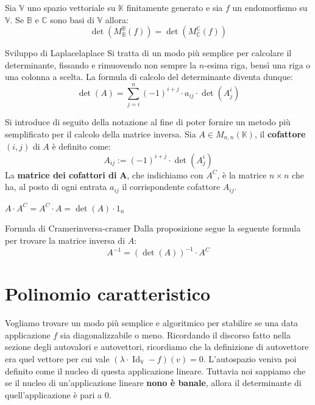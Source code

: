 \documentclass[12pt]{report}
\newcommand{\C}{\mathbb{C}}
\newcommand{\K}{\mathbb{K}}
\newcommand{\V}{\mathbb{V}}
\newcommand{\associatedmatrix}[2]{M^{\mathbb{#1}}_{\mathbb{#2}}}
\begin{document}
	\begin{corollario}{}{}
		Sia $\V$ uno spazio vettoriale su $\K$ finitamente generato e sia $f$ un endomorfismo su $\V$. Se $\mathbb{B}$ e $\C$ sono basi di $\V$ allora:
		\[
			\det(\associatedmatrix{B}{B}(f)) = \det(\associatedmatrix{C}{C}(f))
		\] 
	\end{corollario}
	
	\begin{teorema}{Sviluppo di Laplace}{laplace}
		Si tratta di un modo più semplice per calcolare il determinante, fissando e rimuovendo non sempre la $n$-esima riga, bensì una riga o una colonna a scelta. La formula di calcolo del determinante diventa dunque:
		\[
			\det(A) = \sum_{j=i}^{n} (-1)^{i+j} \cdot a_{ij} \cdot \det(A^{i}_{j})
		\]
	\end{teorema}
	
	Si introduce di seguito della notazione al fine di poter fornire un metodo più semplificato per il calcolo della matrice inversa.
	Sia $A \in M_{n,n}(\K)$, il \textbf{cofattore} $(i, j)$ di $A$ è definito come:
	\[
		A_{ij} := (-1)^{i+j} \cdot \det(A^{i}_{j})
	\]
	La \textbf{matrice dei cofattori di} $\mathbf{A}$, che indichiamo con $A^C$, è la matrice $n \times n$ che ha, al posto di ogni entrata $a_{ij}$ il corrispondente cofattore $A_{ij}$.
	
	\begin{proposizione}{}{}
			$A \cdot A^C = A^C \cdot A = \det(A) \cdot 1_n$
	\end{proposizione}
	
	\begin{teorema}{Formula di Cramer}{inversa-cramer}
		Dalla proposizione segue la seguente formula per trovare la matrice inversa di $A$:
		\[
			A^{-1} = (\det(A))^{-1} \cdot A^C
		\]
	\end{teorema}
	
	\newpage
	\chapter{Polinomio caratteristico}
	Vogliamo trovare un modo più semplice e algoritmico per stabilire se una data applicazione $f$ sia diagonalizzabile o meno.
	Ricordando il discorso fatto nella sezione degli autovalori e autovettori, ricordiamo che la definizione di autovettore era quel vettore per cui vale $(\lambda \cdot \operatorname{Id}_\V- f)(v) = 0$.
	L'autospazio veniva poi definito come il nucleo di questa applicazione lineare. Tuttavia noi sappiamo che se il nucleo di un'applicazione lineare \textbf{nono è banale}, allora il determinante di quell'applicazione è pari a $0$.
	
\end{document}

